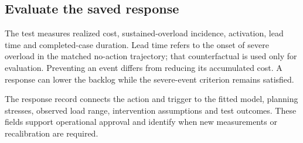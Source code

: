 \subsection{Evaluate the saved response}
The test measures realized cost, sustained-overload incidence, activation, lead time and completed-case duration. Lead time refers to the onset of severe overload in the matched no-action trajectory; that counterfactual is used only for evaluation. Preventing an event differs from reducing its accumulated cost. A response can lower the backlog while the severe-event criterion remains satisfied.

The response record connects the action and trigger to the fitted model, planning stresses, observed load range, intervention assumptions and test outcomes. These fields support operational approval and identify when new measurements or recalibration are required.
